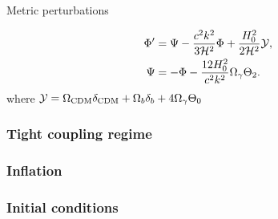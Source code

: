     Metric perturbations

    \begin{subequations}\label{eq:m3:theory:metric_perturbations_final}
        \begin{align}
            \Phi' &= \Psi - \frac{c^2k^2}{3\mathcal{H}^2}\Phi + \frac{H_0^2}{2\mathcal{H}^2}\mathcal{Y}, \label{eq:m3:theory:phi_perturbation}\\
            \Psi &= -\Phi - \frac{12H_0^2}{c^2k^2}\Omega_\gamma\Theta_2. \label{eq:m3:theory:psi_perturbation}
        \end{align}
    \end{subequations}
    where $\mathcal{Y} = \Omega_{\text{CDM}}\delta_{\text{CDM}}+\Omega_b\delta_b+4\Omega_\gamma\Theta_0$

\subsubsection{Tight coupling regime}

\subsubsection{Inflation}
\subsubsection{Initial conditions}
